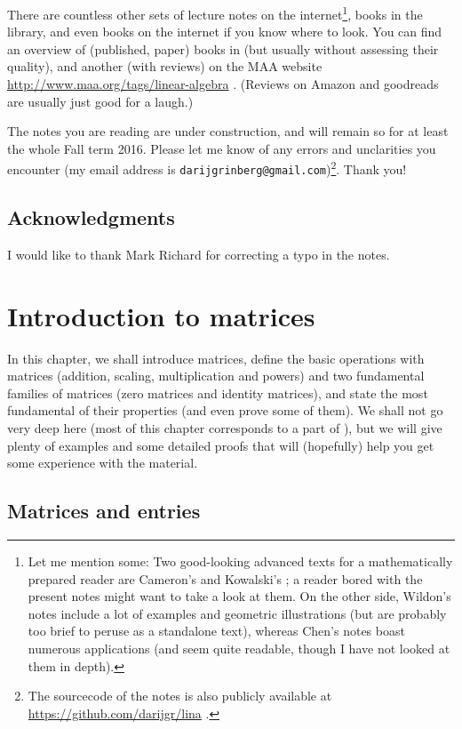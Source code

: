 \documentclass[numbers=enddot,12pt,final,onecolumn,notitlepage]{scrartcl}%
\theoremstyle{definition}
\begin{document}
There are countless other sets of lecture notes on the internet\footnote{Let
me mention some: Two good-looking advanced texts for a mathematically prepared
reader are Cameron's \cite{Camero08} and Kowalski's \cite{Kowals16}; a reader
bored with the present notes might want to take a look at them. On the other
side, Wildon's notes \cite{Wildon16} include a lot of examples and geometric
illustrations (but are probably too brief to peruse as a standalone text),
whereas Chen's notes \cite{Chen08} boast numerous applications (and seem quite
readable, though I have not looked at them in depth).}, books in the library,
and even books on the internet if you know where to look. You can find an
overview of (published, paper) books in \cite{Drucker12} (but usually without
assessing their quality), and another (with reviews) on the MAA website
\url{http://www.maa.org/tags/linear-algebra} . (Reviews on Amazon and
goodreads are usually just good for a laugh.)

The notes you are reading are under construction, and will remain so for at
least the whole Fall term 2016. Please let me know of any errors and
unclarities you encounter (my email address is
\texttt{darijgrinberg@gmail.com})\footnote{The sourcecode of the notes is also
publicly available at \url{https://github.com/darijgr/lina} .}. Thank you!

\subsection{Acknowledgments}

I would like to thank Mark Richard for correcting a typo in the notes.

\section{\label{chp.intro}Introduction to matrices}

In this chapter, we shall introduce matrices, define the basic operations with
matrices (addition, scaling, multiplication and powers) and two fundamental
families of matrices (zero matrices and identity matrices), and state the most
fundamental of their properties (and even prove some of them). We shall not go
very deep here (most of this chapter corresponds to a part of \cite[\S A.2]%
{LaNaSc16}), but we will give plenty of examples and some detailed proofs that
will (hopefully) help you get some experience with the material.

\subsection{Matrices and entries}
\end{document}
